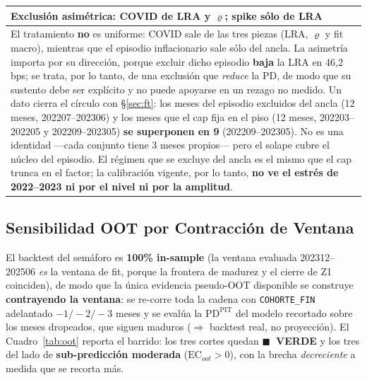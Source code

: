 \documentclass[12pt, a4paper]{article}
\newcommand{\PDPIT}{\ensuremath{\mathrm{PD}^{\mathrm{PIT}}}}
\renewcommand{\rho}{\ensuremath{\varrho}}
\newcommand{\EC}{\ensuremath{\mathrm{EC}}}
\newenvironment{recuadro}[1]
{\begin{center}\begin{tabular}{|p{0.92\textwidth}|}
\hline
\rowcolor{grissuave}
\textbf{#1} \\ \hline
}
{\\ \hline \end{tabular}\end{center}}
\begin{document}
\begin{recuadro}{Exclusión asimétrica: COVID de LRA y $\rho$; spike sólo de LRA}
El tratamiento \textbf{no} es uniforme: COVID sale de las tres piezas (LRA, $\rho$ y fit macro),
mientras que el episodio inflacionario sale sólo del ancla. La asimetría importa por su dirección,
porque excluir dicho episodio \textbf{baja} la LRA en 46,2 bps; se trata, por lo tanto, de una
exclusión que \emph{reduce} la PD, de modo que su sustento debe ser explícito y no puede apoyarse
en un rezago no medido. Un dato cierra el círculo con \S\ref{sec:ft}: los meses del episodio
excluidos del ancla (12 meses, 202207--202306) y los meses que el cap fija en el piso (12 meses,
202203--202205 y 202209--202305) \textbf{se superponen en 9} (202209--202305). No es una identidad ---cada conjunto tiene 3 meses propios--- pero el solape
cubre el núcleo del episodio. El régimen que se excluye del ancla es el mismo que el cap trunca
en el factor; la calibración vigente, por lo tanto, \textbf{no ve el estrés de 2022--2023 ni por el
nivel ni por la amplitud}.
\end{recuadro}

\subsection{Sensibilidad OOT por Contracción de Ventana}
\label{sec:oot}
El backtest del semáforo es \textbf{100\% in-sample} (la ventana evaluada 202312--202506 \emph{es}
la ventana de fit, porque la frontera de madurez y el cierre de Z1 coinciden), de modo que la única
evidencia pseudo-OOT disponible se construye \textbf{contrayendo la ventana}: se re-corre toda la
cadena con \texttt{COHORTE\_FIN} adelantado $-1/-2/-3$ meses y se evalúa la $\PDPIT$ del modelo
recortado sobre los meses dropeados, que siguen maduros ($\Rightarrow$ backtest real, no
proyección). El Cuadro~\ref{tab:oot} reporta el barrido: los tres cortes quedan
\textbf{\textcolor{semverde}{$\blacksquare$}~VERDE} y los tres del lado de \textbf{sub-predicción
moderada} ($\EC_{oot}>0$), con la brecha \emph{decreciente} a medida que se recorta más.
\end{document}
